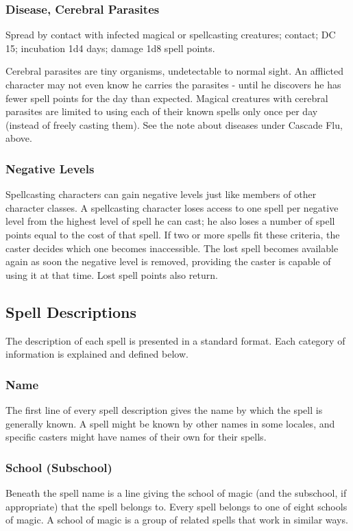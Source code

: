 \subsubsection{Disease, Cerebral Parasites}
Spread by contact with infected magical or spellcasting creatures; contact; DC 15; incubation 1d4 days; damage 1d8 spell points. 

Cerebral parasites are tiny organisms, undetectable to normal sight. 
An afflicted character may not even know he carries the parasites - until he discovers he has fewer spell points for the day than expected. 
Magical creatures with cerebral parasites are limited to using each of their known spells only once per day (instead of freely casting them). 
See the note about diseases under Cascade Flu, above.

\subsubsection{Negative Levels}
\label{sec:NegativeLevels}
Spellcasting characters can gain negative levels just like members of other character classes. 
A spellcasting character loses access to one spell per negative level from the highest level of spell he can cast; 
he also loses a number of spell points equal to the cost of that spell. 
If two or more spells fit these criteria, the caster decides which one becomes inaccessible. 
The lost spell becomes available again as soon the negative level is removed, providing the caster is capable of using it at that time. 
Lost spell points also return.
\subsection{Spell Descriptions}
The description of each spell is presented in a standard format. Each category of information is explained and defined below.
\subsubsection{Name}
The first line of every spell description gives the name by which the spell is generally known. 
A spell might be known by other names in some locales, and specific casters might have names of their own for their spells.

\subsubsection{School (Subschool)}
\label{sec:MagicalSchools}
Beneath the spell name is a line giving the school of magic (and the subschool, if appropriate) that the spell belongs to.
Every spell belongs to one of eight schools of magic. A school of magic is a group of related spells that work in similar ways.
